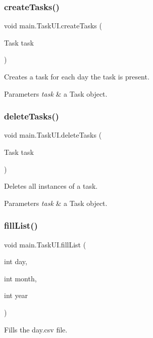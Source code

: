 \subsubsection{create\+Tasks()}
{\footnotesize\ttfamily void main.\+Task\+U\+I.\+create\+Tasks (\begin{DoxyParamCaption}\item[{Task}]{task }\end{DoxyParamCaption})}

Creates a task for each day the task is present.


\begin{DoxyParams}{Parameters}
{\em task} & a Task object. \\
\hline
\end{DoxyParams}
\mbox{\label{classmain_1_1_task_u_i_a6527ada9964eafbb2d283a14c96aeb4e}} 
\subsubsection{delete\+Tasks()}
{\footnotesize\ttfamily void main.\+Task\+U\+I.\+delete\+Tasks (\begin{DoxyParamCaption}\item[{Task}]{task }\end{DoxyParamCaption})}

Deletes all instances of a task.


\begin{DoxyParams}{Parameters}
{\em task} & a Task object. \\
\hline
\end{DoxyParams}
\mbox{\label{classmain_1_1_task_u_i_a1dfb5cce70e2c7ef333e4f4c99d6c029}} 
\subsubsection{fill\+List()}
{\footnotesize\ttfamily void main.\+Task\+U\+I.\+fill\+List (\begin{DoxyParamCaption}\item[{int}]{day,  }\item[{int}]{month,  }\item[{int}]{year }\end{DoxyParamCaption})}

Fills the day.\+csv file.


